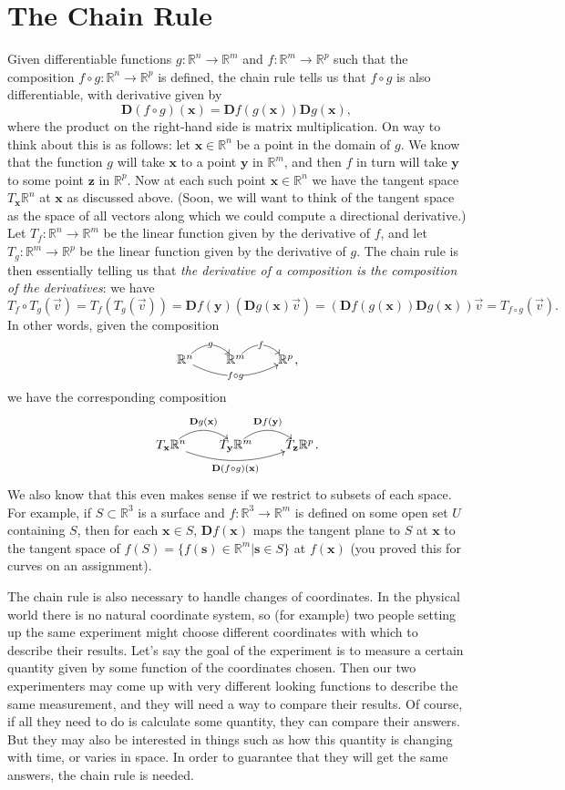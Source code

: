 \documentclass[12pt,letterpaper]{article}
\newcommand{\R}{\mathbb{R}}
\newcommand{\D}{\mathbf{D}}
\newcommand{\x}{\mathbf{x}}
\newcommand{\y}{\mathbf{y}}
\begin{document}
\section{The Chain Rule}
Given differentiable functions $g:\R^n\to \R^m$ and $f:\R^m\to \R^p$ such that the composition $f\circ g:\R^n\to \R^p$ is defined, the chain rule tells us that $f\circ g$ is also differentiable, with derivative given by
\[
 \D (f\circ g)(\x) = \D f(g(\x))\D g(\x),
\]
where the product on the right-hand side is matrix multiplication. On way to think about this is as follows: let $\x\in\R^n$ be a point in the domain of $g$. We know that the function $g$ will take $\x$ to a point $\y$ in $\R^m$, and then $f$ in turn will take $\y$ to some point $\mathbf{z}$ in $\R^p$. Now at each such point $\x\in \R^n$ we have the tangent space $T_\x \R^n$ at $\x$ as discussed above. (Soon, we will want to think of the tangent space as the space of all vectors along which we could compute a directional derivative.)
Let $T_f:\R^n\to \R^m$ be the linear function given by the derivative of $f$, and let $T_g:\R^m\to \R^p$ be the linear function given by the derivative of $g$. The chain rule is then essentially telling us that {\em the derivative of a composition is the composition of the derivatives}: we have
\[
 T_f\circ T_g(\vec{v}) = T_f(T_g(\vec{v})) = \D f(\y)(\D g(\x)\vec{v}) = (\D f(g(\x))\D g(\x))\vec{v} = T_{f\circ g}(\vec{v}).
\]
In other words, given the composition
\[
 \xymatrix@1{\R^n \ar@/^1pc/[r]|g \ar@/_1pc/[rr]|{f\circ g} & \R^m \ar@/^1pc/[r]|f & \R^p},
\]
we have the corresponding composition
\[
 \xymatrix@1{T_\x\R^n \ar@/^1pc/[r]^{\D g(\x)} \ar@/_1pc/[rr]_{\D(f\circ g)(\x)} & T_\y\R^m \ar@/^1pc/[r]^{\D f(\y)} & T_{\mathbf{z}}\R^p}.
\]
We also know that this even makes sense if we restrict to subsets of each space. For example, if $S\subset \R^3$ is a surface and $f:\R^3\to \R^m$ is defined on some open set $U$ containing $S$, then for each $\x\in S$, $\D f(\x)$ maps the tangent plane to $S$ at $\x$ to the tangent space of $f(S) = \{f(\mathbf{s})\in \R^m|\mathbf{s}\in S\}$ at $f(\x)$ (you proved this for curves on an assignment).

The chain rule is also necessary to handle changes of coordinates. In the physical world there is no natural coordinate system, so (for example) two people setting up the same experiment might choose different coordinates with which to describe their results. Let's say the goal of the experiment is to measure a certain quantity given by some function of the coordinates chosen. Then our two experimenters may come up with very different looking functions to describe the same measurement, and they will need a way to compare their results. Of course, if all they need to do is calculate some quantity, they can compare their answers. But they may also be interested in things such as how this quantity is changing with time, or varies in space. In order to guarantee that they will get the same answers, the chain rule is needed.
\end{document}
